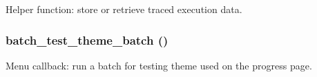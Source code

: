 \label{batch__test_8module_a94b2eb54ae9fc920654ceee3aa29786f}
Helper function: store or retrieve traced execution data. \hypertarget{batch__test_8module_ac3c6c00cf4a9425c1156a58d8a62b74e}{
\subsubsection[{batch\_\-test\_\-theme\_\-batch}]{\setlength{\rightskip}{0pt plus 5cm}batch\_\-test\_\-theme\_\-batch ()}}
\label{batch__test_8module_ac3c6c00cf4a9425c1156a58d8a62b74e}
Menu callback: run a batch for testing theme used on the progress page. 